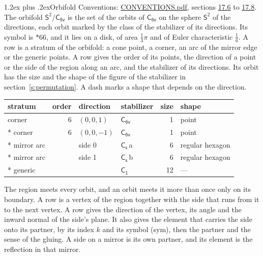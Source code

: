 \documentclass[10pt,a4paper]{article}
\makeatletter
\renewcommand\section{\@startsection{section}{1}{\z@}{-3ex plus -1ex minus -.2ex}%
  {1.2ex plus .2ex}{\normalfont\large\sffamily\bfseries\color{parttitle}}}
\numberwithin{equation}{section}
\newcommand{\grp}[1]{\mathsf{#1}}
\newcommand{\orbname}[1]{#1}
\newcommand{\clsletter}[1]{\,{\scriptsize\color{black!55}#1}}
\newcommand{\dirvec}[3]{(#1, #2, #3)}
\newcommand{\twosphere}{\mathsf{S}^{2}}
\makeatother
\begin{document}
\section{Orbifold}\label{s:orbifold}
Conventions: \href{../../CONVENTIONS.pdf}{CONVENTIONS.pdf}, sections \href{../../CONVENTIONS.pdf\#conv.17.6}{17.6} to \href{../../CONVENTIONS.pdf\#conv.17.8}{17.8}.
The orbifold $\twosphere/\grp{C_{6v}}$ is the set of the orbits of $\grp{C_{6v}}$ on the sphere $\twosphere$ of the directions, each orbit marked by the class of the stabilizer of its directions. Its symbol is $\orbname{{\ast}66}$, and it lies on a disk, of area $\tfrac{1}{3}\pi$ and of Euler characteristic $\tfrac{1}{6}$.
\leavevmode\label{n:head.stratum}\label{n:head.order.point}\label{n:head.direction}\label{n:head.stabilizer}\label{n:head.size.orbit}\label{n:head.shape}A row is a stratum of the orbifold: a cone point, a corner, an arc of the mirror edge or the generic points. A row gives the order of its points, the direction of a point or the side of the region along an arc, and the stabilizer of its directions. Its orbit has the size and the shape of the figure of the stabilizer in section~\ref{s:permutation}. A dash marks a shape that depends on the direction.
{\small\setlength{\tabcolsep}{4pt}\begin{longtable}{@{}lrllrl@{}}\toprule
stratum & order & direction & stabilizer & size & shape\\\midrule\endhead
\bottomrule\endfoot\endlastfoot
corner & 6 & $\dirvec{0}{0}{1}$ & \href{C6v.pdf}{$\grp{C_{6v}}$} & 1 & point\\*
corner & 6 & $\dirvec{0}{0}{-1}$ & \href{C6v.pdf}{$\grp{C_{6v}}$} & 1 & point\\*
mirror arc &  & side 0 & \href{C1v.pdf}{$\grp{C_{s}}$}\clsletter{a} & 6 & regular hexagon\\*
mirror arc &  & side 1 & \href{C1v.pdf}{$\grp{C_{s}}$}\clsletter{b} & 6 & regular hexagon\\*
generic &  &  & \href{C1.pdf}{$\grp{C_{1}}$} & 12 & ---\\
\bottomrule\end{longtable}}
\leavevmode\label{n:head.vertex.region}\label{n:head.angle}\label{n:head.normal.side}\label{n:head.partner}\label{n:head.sense}The region meets every orbit, and an orbit meets it more than once only on its boundary. A row is a vertex of the region together with the side that runs from it to the next vertex. A row gives the direction of the vertex, its angle and the inward normal of the side's plane. It also gives the element that carries the side onto its partner, by its index $k$ and its symbol (sym), then the partner and the sense of the gluing. A side on a mirror is its own partner, and its element is the reflection in that mirror.
\end{document}
